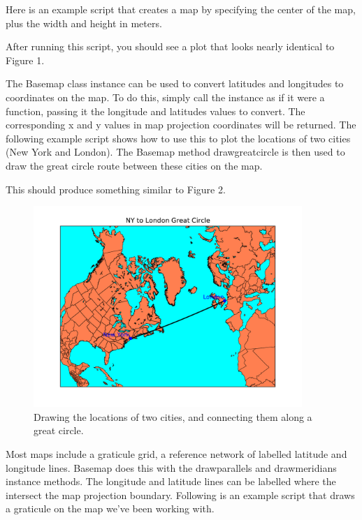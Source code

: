 \medskip{}
Here is an example script that creates a map by specifying the center
of the map, plus the width and height in meters.



After running this script, you should see a plot that looks nearly
identical to Figure 1.\medskip{}


The Basemap class instance can be used to convert latitudes and longitudes
to coordinates on the map. To do this, simply call the instance as
if it were a function, passing it the longitude and latitudes values
to convert. The corresponding x and y values in map projection coordinates
will be returned. The following example script shows how to use this
to plot the locations of two cities (New York and London). The Basemap
method drawgreatcircle is then used to draw the great circle route
between these cities on the map.



This should produce something similar to Figure 2.

\begin{figure}[h]
\includegraphics[width=4in]{fig/basemap3}

\caption{Drawing the locations of two cities, and connecting them along a great
circle.}

\end{figure}

\medskip{}
Most maps include a graticule grid, a reference network of labelled
latitude and longitude lines. Basemap does this with the drawparallels
and drawmeridians instance methods. The longitude and latitude lines
can be labelled where the intersect the map projection boundary. Following
is an example script that draws a graticule on the map we've been
working with.

